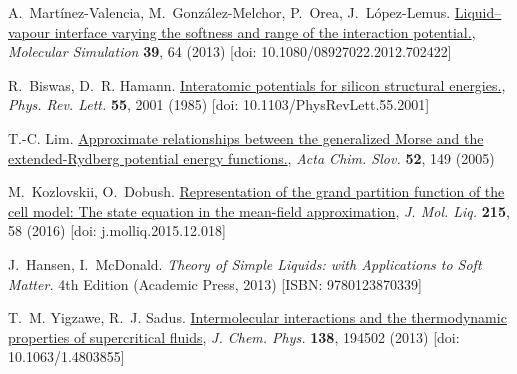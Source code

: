 \begin{thebibliography}{9}
	 A.~Martínez-Valencia, M.~González-Melchor, P.~Orea, J.~López-Lemus.
	\href{https://doi.org/10.1080/08927022.2012.702422}{Liquid–vapour interface
	varying the softness and range of the interaction potential.}, \textit{Molecular
	Simulation} \textbf{39}, 64 (2013) [doi: 10.1080/08927022.2012.702422]
	
	 R.~Biswas, D.~R. Hamann.
	\href{https://link.aps.org/doi/10.1103/PhysRevLett.55.2001}{Interatomic
	potentials for silicon structural energies.}, \textit{Phys. Rev. Lett.} \textbf{55}, 2001 (1985) [doi: 10.1103/PhysRevLett.55.2001]
	
	 T.-C. Lim. \href{https://acta-arhiv.chem-soc.si/52/52-2-149.htm}{Approximate
	relationships between the generalized Morse and the extended-Rydberg potential energy functions.}, \textit{Acta Chim. Slov.} \textbf{52}, 149 (2005)
	
	 M.~Kozlovskii, O.~Dobush.
	\href{https://www.sciencedirect.com/science/article/pii/S0167732215312101}{Representation of the grand partition function of the cell model: The state equation in the mean-field approximation}, \textit{J. Mol. Liq.} \textbf{215}, 58 (2016) [doi: j.molliq.2015.12.018]
	
	 J.~Hansen, I.~McDonald. \textit{Theory of Simple Liquids: with Applications to Soft Matter.} 4th Edition (Academic Press, 2013) [ISBN: 9780123870339]
	
	 T.~M. Yigzawe, R.~J. Sadus.
	\href{https://doi.org/10.1063/1.4803855}{Intermolecular interactions and the thermodynamic properties of supercritical fluids}, \textit{J. Chem. Phys.} \textbf{138}, 194502 (2013) [doi: 10.1063/1.4803855]
		
\end{thebibliography}
	